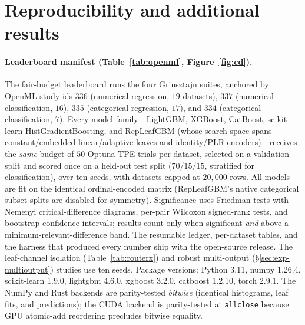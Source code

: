 \documentclass[11pt]{article}
\begin{document}
\section{Reproducibility and additional results}
\label{app:repro}

\paragraph{Leaderboard manifest (Table~\ref{tab:openml}, Figure~\ref{fig:cd}).}
The fair-budget leaderboard runs the four Grinsztajn suites, anchored by OpenML
study ids $336$ (numerical regression, $19$ datasets), $337$ (numerical
classification, $16$), $335$ (categorical regression, $17$), and $334$ (categorical
classification, $7$). Every model family---LightGBM, XGBoost, CatBoost, scikit-learn
HistGradientBoosting, and RepLeafGBM (whose search space spans
constant/embedded-linear/adaptive leaves and identity/PLR encoders)---receives the
\emph{same} budget of $50$ Optuna TPE trials per dataset, selected on a validation
split and scored once on a held-out test split ($70/15/15$, stratified for
classification), over ten seeds, with datasets capped at $20{,}000$ rows. All models
are fit on the identical ordinal-encoded matrix (RepLeafGBM's native categorical subset
splits are disabled for symmetry). Significance uses Friedman tests with Nemenyi
critical-difference diagrams, per-pair Wilcoxon signed-rank tests, and bootstrap
confidence intervals; results count only when significant \emph{and} above a
minimum-relevant-difference band. The resumable ledger, per-dataset tables, and the
harness that produced every number ship with the open-source release. The
leaf-channel isolation (Table~\ref{tab:routerx}) and robust multi-output
(\S\ref{sec:exp-multioutput}) studies use ten seeds. Package versions: Python 3.11,
numpy 1.26.4, scikit-learn 1.9.0, lightgbm 4.6.0, xgboost 3.2.0, catboost 1.2.10,
torch 2.9.1. The NumPy and Rust backends are parity-tested \emph{bitwise} (identical
histograms, leaf fits, and predictions); the CUDA backend is parity-tested at
\texttt{allclose} because GPU atomic-add reordering precludes bitwise equality.
\end{document}
